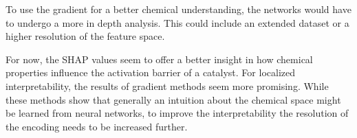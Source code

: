 To use the gradient for a better chemical understanding, the networks would have to undergo a more in depth analysis.
This could include an extended dataset or a higher resolution of the feature space.

For now, the SHAP values seem to offer a better insight in how chemical properties influence the activation barrier of a catalyst.
For localized interpretability, the results of gradient methods seem more promising.
While these methods show that generally an intuition about the chemical space might be learned from neural networks,
to improve the interpretability the resolution of the encoding needs to be increased further.